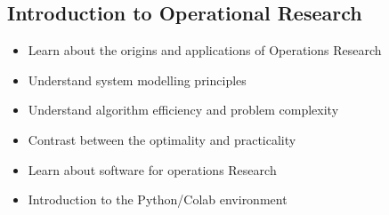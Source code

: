 



\subsection{Introduction to Operational Research}





\begin{itemize}
  \item Learn about the origins and applications of Operations Research
  \item Understand system modelling principles
  \item Understand algorithm efficiency and problem complexity
  \item Contrast between the optimality and practicality
  \item Learn about software for operations Research
  \item Introduction to the Python/Colab environment
\end{itemize}
